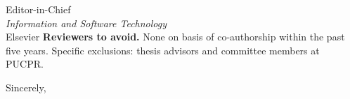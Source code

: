 \documentclass[11pt,a4paper]{letter}
\begin{document}
\begin{letter}{Editor-in-Chief \\ \emph{Information and Software Technology} \\ Elsevier}
\medskip\noindent\textbf{Reviewers to avoid.}
None on basis of co-authorship within the past five years. Specific
exclusions: thesis advisors and committee members at PUCPR.

\closing{Sincerely,}

\end{letter}
\end{document}
